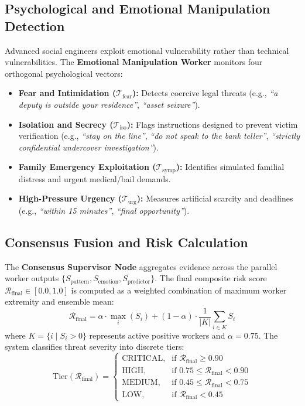 \documentclass[conference]{IEEEtran}
\begin{document}
\subsection{Psychological and Emotional Manipulation Detection}
Advanced social engineers exploit emotional vulnerability rather than technical vulnerabilities. The \textbf{Emotional Manipulation Worker} monitors four orthogonal psychological vectors:
\begin{itemize}
    \item \textbf{Fear and Intimidation ($\mathcal{T}_{\text{fear}}$):} Detects coercive legal threats (e.g., \textit{``a deputy is outside your residence''}, \textit{``asset seizure''}).
    \item \textbf{Isolation and Secrecy ($\mathcal{T}_{\text{iso}}$):} Flags instructions designed to prevent victim verification (e.g., \textit{``stay on the line''}, \textit{``do not speak to the bank teller''}, \textit{``strictly confidential undercover investigation''}).
    \item \textbf{Family Emergency Exploitation ($\mathcal{T}_{\text{symp}}$):} Identifies simulated familial distress and urgent medical/bail demands.
    \item \textbf{High-Pressure Urgency ($\mathcal{T}_{\text{urg}}$):} Measures artificial scarcity and deadlines (e.g., \textit{``within 15 minutes''}, \textit{``final opportunity''}).
\end{itemize}

\subsection{Consensus Fusion and Risk Calculation}
The \textbf{Consensus Supervisor Node} aggregates evidence across the parallel worker outputs $\{S_{\text{pattern}}, S_{\text{emotion}}, S_{\text{predictor}}\}$. The final composite risk score $\mathcal{R}_{\text{final}} \in [0.0, 1.0]$ is computed as a weighted combination of maximum worker extremity and ensemble mean:
\begin{equation}
\mathcal{R}_{\text{final}} = \alpha \cdot \max_{i} (S_i) + (1 - \alpha) \cdot \frac{1}{|K|} \sum_{i \in K} S_i
\end{equation}
where $K = \{i \mid S_i > 0\}$ represents active positive workers and $\alpha = 0.75$. The system classifies threat severity into discrete tiers:
\begin{equation}
\text{Tier}(\mathcal{R}_{\text{final}}) = 
\begin{cases}
\text{CRITICAL}, & \text{if } \mathcal{R}_{\text{final}} \ge 0.90 \\
\text{HIGH}, & \text{if } 0.75 \le \mathcal{R}_{\text{final}} < 0.90 \\
\text{MEDIUM}, & \text{if } 0.45 \le \mathcal{R}_{\text{final}} < 0.75 \\
\text{LOW}, & \text{if } \mathcal{R}_{\text{final}} < 0.45
\end{cases}
\end{equation}
\end{document}
